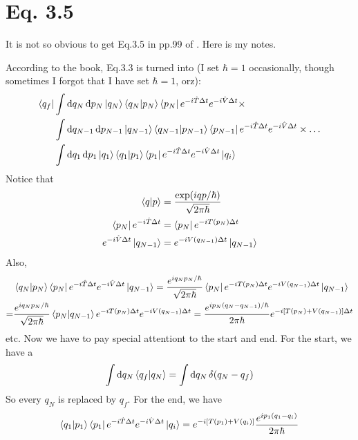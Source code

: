 \documentclass{article}
\begin{document}
\section{Eq. 3.5}

It is not so obvious to get Eq.3.5 in pp.99 of \cite{Altland2010}. Here is my
notes.

According to the book, Eq.3.3 is turned into (I set $\hbar=1$ occasionally,
though sometimes I forgot that I have set $\hbar=1$, orz):
\begin{align}
    \bra{q_f} 
    &\int \dd{q_N}\dd{p_N}\ket{q_N}\braket{q_N|p_N}\bra{p_N}
        e^{-i\hat{T}\Delta t}e^{-i\hat{V}\Delta t}\times \nonumber\\
    &   \int \dd{q_{N-1}}\dd{p_{N-1}}\ket{q_{N-1}}\braket{q_{N-1}|p_{N-1}}\bra{p_{N-1}}
        e^{-i\hat{T}\Delta t}e^{-i\hat{V}\Delta t} \times
        \dots \nonumber\\
    &   \int \dd{q_1}\dd{p_1}\ket{q_1}\braket{q_1|p_1}\bra{p_1}
        e^{-i\hat{T}\Delta t}e^{-i\hat{V}\Delta t} \ket{q_i}
\end{align}
Notice that
\begin{align}
    \braket{q|p} &= \frac{\exp(iqp/\hbar)}{\sqrt{2\pi\hbar}} \\
    \bra{p_N}e^{-i\hat{T}\Delta t} &= \bra{p_N}e^{-iT(p_N)\Delta t} \\
    e^{-i\hat{V}\Delta t}\ket{q_{N-1}} &= e^{-iV(q_{N-1})\Delta t}\ket{q_{N-1}} \\
\end{align}
Also, 
\begin{align}
    &\braket{q_N|p_N}\bra{p_N}e^{-i\hat{T}\Delta t}e^{-i\hat{V}\Delta t}\ket{q_{N-1}} 
    = \frac{e^{iq_N p_N/\hbar}}{\sqrt{2\pi\hbar}}
        \bra{p_N}e^{-iT(p_N)\Delta t} e^{-iV(q_{N-1})\Delta t}\ket{q_{N-1}}
    \nonumber\\
    =& \frac{e^{iq_N p_N/\hbar}}{\sqrt{2\pi\hbar}}
        \braket{p_N | q_{N-1}}e^{-iT(p_N)\Delta t} e^{-iV(q_{N-1})\Delta t}
    = \frac{e^{ip_N (q_N-q_{N-1})/\hbar}}{2\pi\hbar}
        e^{-i[T(p_N)+V(q_{N-1})]\Delta t} 
\end{align}
etc. Now we have to pay special attentiont to the start and end. For the start,
we have a
$$ \int \dd{q_N} \braket{q_f | q_N} = \int\dd{q_N}\delta(q_N-q_f) $$
So every $q_N$ is replaced by $q_f$. For the end, we have
$$ \braket{q_1|p_1}\bra{p_1}e^{-i\hat{T}\Delta t}e^{-i\hat{V}\Delta t} \ket{q_i}
= e^{-i[T(p_1)+V(q_i)]}\frac{e^{ip_1(q_1-q_i)}}{2\pi\hbar}
$$
\end{document}
